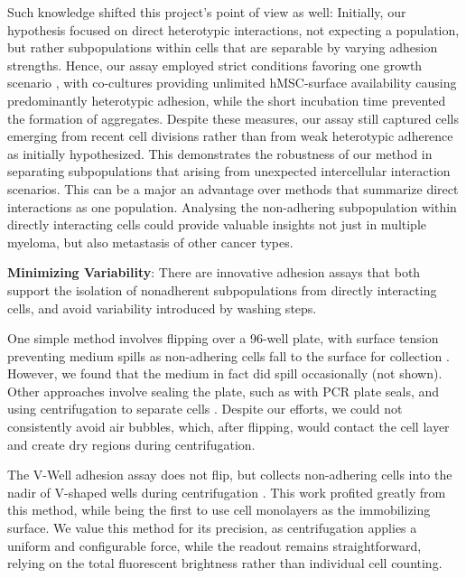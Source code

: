 Such knowledge shifted this project's point of view as well: Initially, our
hypothesis focused on direct heterotypic interactions, not expecting a \nMAina
population, but rather subpopulations within \MAina cells that are separable by
varying adhesion strengths. Hence, our assay employed strict conditions favoring
one growth scenario , with co-cultures
providing unlimited hMSC-surface availability causing predominantly heterotypic
adhesion, while the short incubation time prevented the formation of aggregates.
Despite these measures, our assay still captured cells emerging from recent cell
divisions rather than from weak heterotypic adherence as initially hypothesized.
This demonstrates the robustness of our method in separating subpopulations that
arising from unexpected intercellular interaction scenarios. This can be a major
an advantage over methods that summarize direct interactions as one population.
Analysing the non-adhering subpopulation within directly interacting cells could
provide valuable insights not just in multiple myeloma, but also metastasis of
other cancer types.


\textbf{Minimizing Variability}:
There are innovative adhesion assays that both
support the isolation of nonadherent subpopulations from directly interacting
cells, and avoid variability introduced by washing steps.

One simple method involves flipping over a 96-well plate, with surface tension
preventing medium spills as non-adhering cells fall to the surface for
collection \cite{zepeda-morenoInnovativeMethodQuantification2011}. However, we
found that the medium in fact did spill occasionally (not shown). Other
approaches involve sealing the plate, such as with PCR plate seals, and using
centrifugation to separate cells \cite{reyesCentrifugationCellAdhesion2003,
      chenHighThroughputScreeningTest2021}. Despite our efforts, we could not
consistently avoid air bubbles, which, after flipping, would contact the cell
layer and create dry regions during centrifugation.

The V-Well adhesion assay does not flip, but collects non-adhering cells into
the nadir of V-shaped wells during centrifugation
\cite{weetallHomogeneousFluorometricAssay2001}. This work profited greatly from
this method, while  being the first to use cell
monolayers as the immobilizing surface. We value this method for its precision,
as centrifugation applies a uniform and configurable force, while the readout
remains straightforward, relying on the total fluorescent brightness rather than
individual cell counting.




